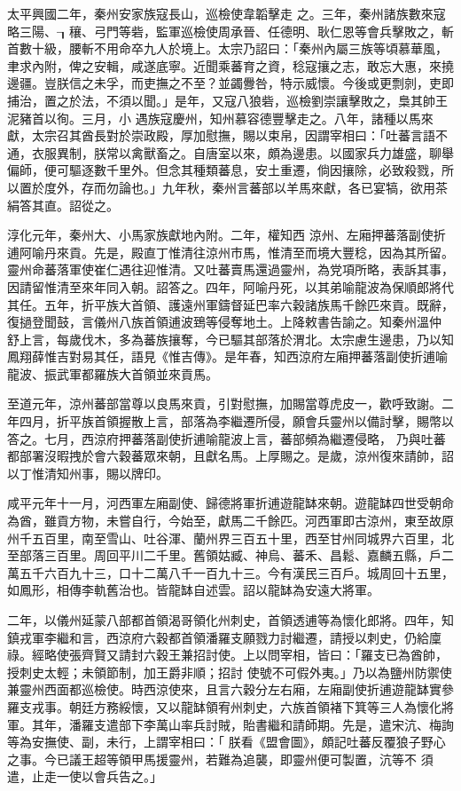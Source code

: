 \begin{pinyinscope}
 太平興國二年，秦州安家族寇長山，巡檢使韋韜擊走
 之。三年，秦州諸族數來寇略三陽、┒穰、弓門等砦，監軍巡檢使周承晉、任德明、耿仁恩等會兵擊敗之，斬首數十級，腰斬不用命卒九人於境上。太宗乃詔曰：「秦州內屬三族等頃慕華風，聿求內附，俾之安輯，咸遂底寧。近聞乘蕃育之資，稔寇攘之志，敢忘大惠，來撓邊疆。豈朕信之未孚，而吏撫之不至？並蠲釁咎，特示威懷。今後或更剽剠，吏即捕治，置之於法，不須以聞。」是年，又寇八狼砦，巡檢劉崇讓擊敗之，梟其帥王泥豬首以徇。三月，小
 遇族寇慶州，知州慕容德豐擊走之。八年，諸種以馬來獻，太宗召其酋長對於崇政殿，厚加慰撫，賜以束帛，因謂宰相曰：「吐蕃言語不通，衣服異制，朕常以禽獸畜之。自唐室以來，頗為邊患。以國家兵力雄盛，聊舉偏師，便可驅逐數千里外。但念其種類蕃息，安土重遷，倘因攘除，必致殺戮，所以置於度外，存而勿論也。」九年秋，秦州言蕃部以羊馬來獻，各已宴犒，欲用茶絹答其直。詔從之。



 淳化元年，秦州大、小馬家族獻地內附。二年，權知西
 涼州、左廂押蕃落副使折逋阿喻丹來貢。先是，殿直丁惟清往涼州市馬，惟清至而境大豐稔，因為其所留。靈州命蕃落軍使崔仁遇往迎惟清。又吐蕃賣馬還過靈州，為党項所略，表訴其事，因請留惟清至來年同入朝。詔答之。四年，阿喻丹死，以其弟喻龍波為保順郎將代其任。五年，折平族大首領、護遠州軍鑄督延巴率六穀諸族馬千餘匹來貢。既辭，復撾登聞鼓，言儀州八族首領逋波鵄等侵奪地土。上降敕書告諭之。知秦州溫仲
 舒上言，每歲伐木，多為蕃族攘奪，今已驅其部落於渭北。太宗慮生邊患，乃以知鳳翔薛惟吉對易其任，語見《惟吉傳》。是年春，知西涼府左廂押蕃落副使折逋喻龍波、振武軍都羅族大首領並來貢馬。



 至道元年，涼州蕃部當尊以良馬來貢，引對慰撫，加賜當尊虎皮一，歡呼致謝。二年四月，折平族首領握散上言，部落為李繼遷所侵，願會兵靈州以備討擊，賜幣以答之。七月，西涼府押蕃落副使折逋喻龍波上言，蕃部頻為繼遷侵略，
 乃與吐蕃都部署沒暇拽於會六穀蕃眾來朝，且獻名馬。上厚賜之。是歲，涼州復來請帥，詔以丁惟清知州事，賜以牌印。



 咸平元年十一月，河西軍左廂副使、歸德將軍折逋遊龍缽來朝。遊龍缽四世受朝命為酋，雖貢方物，未嘗自行，今始至，獻馬二千餘匹。河西軍即古涼州，東至故原州千五百里，南至雪山、吐谷渾、蘭州界三百五十里，西至甘州同城界六百里，北至部落三百里。周回平川二千里。舊領姑臧、神烏、蕃禾、昌鬆、嘉麟五縣，戶二
 萬五千六百九十三，口十二萬八千一百九十三。今有漢民三百戶。城周回十五里，如鳳形，相傳李軌舊治也。皆龍缽自述雲。詔以龍缽為安遠大將軍。



 二年，以儀州延蒙八部都首領渴哥領化州刺史，首領透逋等為懷化郎將。四年，知鎮戎軍李繼和言，西涼府六穀都首領潘羅支願戮力討繼遷，請授以刺史，仍給廩祿。經略使張齊賢又請封六穀王兼招討使。上以問宰相，皆曰：「羅支已為酋帥，授刺史太輕；未領節制，加王爵非順；招討
 使號不可假外夷。」乃以為鹽州防禦使兼靈州西面都巡檢使。時西涼使來，且言六穀分左右廂，左廂副使折逋遊龍缽實參羅支戎事。朝廷方務綏懷，又以龍缽領宥州刺史，六族首領褚下箕等三人為懷化將軍。其年，潘羅支遣部下李萬山率兵討賊，貽書繼和請師期。先是，遣宋沆、梅詢等為安撫使、副，未行，上謂宰相曰：「 朕看《盟會圖》，頗記吐蕃反覆狼子野心之事。今已議王超等領甲馬援靈州，若難為追襲，即靈州便可製置，沆等不
 須遣，止走一使以會兵告之。」




\end{pinyinscope}

